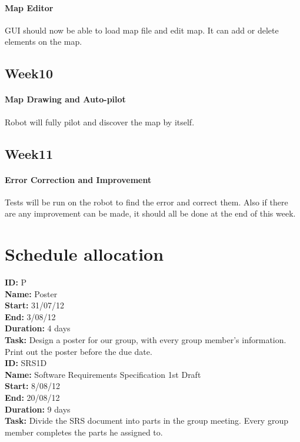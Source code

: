 \documentclass[11pt, a4paper]{report}
\begin{document}
\paragraph{Map Editor}
GUI should now be able to load map file and edit map. It can add or delete elements on the map.




\subsection{Week10}
\paragraph{Map Drawing and Auto-pilot}
Robot will fully pilot and discover the map by itself.


\subsection{Week11}
\paragraph{Error Correction and Improvement}
Tests will be run on the robot to find the error and correct them. Also if there are any improvement can be made, it should all be done at the end of this week.



\section{Schedule allocation}

\noindent \textbf{ID:} P \\
\noindent \textbf{Name:} Poster \\
\noindent \textbf{Start:} 31/07/12 \\
\noindent \textbf{End:} 3/08/12 \\
\noindent \textbf{Duration:} 4 days \\
\noindent \textbf{Task:}  Design a poster for our group, with every group member's information. Print out the poster before the due date.\\[0.5cm]

\noindent \textbf{ID:} SRS1D \\
\noindent \textbf{Name:} Software Requirements Specification 1st Draft\\
\noindent \textbf{Start:} 8/08/12 \\
\noindent \textbf{End:} 20/08/12 \\
\noindent \textbf{Duration:} 9 days \\
\noindent \textbf{Task:} Divide the SRS document into parts in the group meeting. Every group member completes the parts he assigned to.\\[0.5cm]
\end{document}
